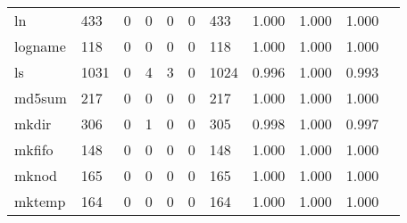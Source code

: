 \begin{longtable}{lp{1.10cm}p{1.10cm}p{1.10cm}p{1.10cm}p{1.10cm}p{1.10cm}p{1.10cm}p{1.10cm}p{1.10cm}p{1.10cm}}
ln        &                    433 &                                  0 &                                 0 &                                0 &                                 0 &                             433 &                             1.000 &                                 1.000 &                               1.000 \\
logname   &                    118 &                                  0 &                                 0 &                                0 &                                 0 &                             118 &                             1.000 &                                 1.000 &                               1.000 \\
ls        &                   1031 &                                  0 &                                 4 &                                3 &                                 0 &                            1024 &                             0.996 &                                 1.000 &                               0.993 \\
md5sum    &                    217 &                                  0 &                                 0 &                                0 &                                 0 &                             217 &                             1.000 &                                 1.000 &                               1.000 \\
mkdir     &                    306 &                                  0 &                                 1 &                                0 &                                 0 &                             305 &                             0.998 &                                 1.000 &                               0.997 \\
mkfifo    &                    148 &                                  0 &                                 0 &                                0 &                                 0 &                             148 &                             1.000 &                                 1.000 &                               1.000 \\
mknod     &                    165 &                                  0 &                                 0 &                                0 &                                 0 &                             165 &                             1.000 &                                 1.000 &                               1.000 \\
mktemp    &                    164 &                                  0 &                                 0 &                                0 &                                 0 &                             164 &                             1.000 &                                 1.000 &                               1.000 \\

\end{longtable}
